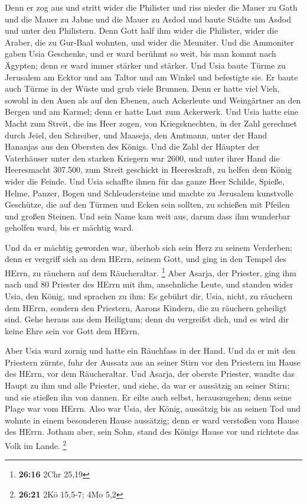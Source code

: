  Denn er zog aus und stritt wider die Philister und riss
nieder die Mauer zu Gath und die Mauer zu Jabne und die Mauer zu Asdod
und baute Städte um Asdod und unter den Philistern.  Denn
Gott half ihm wider die Philister, wider die Araber, die zu Gur-Baal
wohnten, und wider die Meuniter.  Und die Ammoniter gaben
Usia Geschenke, und er ward berühmt so weit, bis man kommt nach Ägypten;
denn er ward immer stärker und stärker.  Und Usia baute
Türme zu Jerusalem am Ecktor und am Taltor und am Winkel und befestigte
sie.  Er baute auch Türme in der Wüste und grub viele
Brunnen. Denn er hatte viel Vieh, sowohl in den Auen als auf den Ebenen,
auch Ackerleute und Weingärtner an den Bergen und am Karmel; denn er
hatte Lust zum Ackerwerk.  Und Usia hatte eine Macht zum
Streit, die ins Heer zogen, von Kriegsknechten, in der Zahl gerechnet
durch Jeiel, den Schreiber, und Maaseja, den Amtmann, unter der Hand
Hananjas aus den Obersten des Königs.  Und die Zahl der
Häupter der Vaterhäuser unter den starken Kriegern war 2600,
 und unter ihrer Hand die Heeresmacht 307.500, zum Streit
geschickt in Heereskraft, zu helfen dem König wider die Feinde.
 Und Usia schaffte ihnen für das ganze Heer Schilde,
Spieße, Helme, Panzer, Bogen und Schleudersteine  und
machte zu Jerusalem kunstvolle Geschütze, die auf den Türmen und Ecken
sein sollten, zu schießen mit Pfeilen und großen Steinen. Und sein Name
kam weit aus, darum dass ihm wunderbar geholfen ward, bis er mächtig
ward.

 Und da er mächtig geworden war, überhob sich sein Herz zu
seinem Verderben; denn er vergriff sich an dem HErrn, seinem Gott, und
ging in den Tempel des HErrn, zu räuchern auf dem Räucheraltar.
\footnote{\textbf{26:16} 2Chr 25,19}  Aber Asarja, der
Priester, ging ihm nach und 80 Priester des HErrn mit ihm, ansehnliche
Leute,  und standen wider Usia, den König, und sprachen zu
ihm: Es gebührt dir, Usia, nicht, zu räuchern dem HErrn, sondern den
Priestern, Aarons Kindern, die zu räuchern geheiligt sind. Gehe heraus
aus dem Heiligtum; denn du vergreifst dich, und es wird dir keine Ehre
sein vor Gott dem HErrn.

 Aber Usia ward zornig und hatte ein Räuchfass in der Hand.
Und da er mit den Priestern zürnte, fuhr der Aussatz aus an seiner Stirn
vor den Priestern im Hause des HErrn, vor dem Räucheraltar.
 Und Asarja, der oberste Priester, wandte das Haupt zu ihm
und alle Priester, und siehe, da war er aussätzig an seiner Stirn; und
sie stießen ihn von dannen. Er eilte auch selbst, herauszugehen; denn
seine Plage war vom HErrn.  Also war Usia, der König,
aussätzig bis an seinen Tod und wohnte in einem besonderen Hause
aussätzig; denn er ward verstoßen vom Hause des HErrn. Jotham aber, sein
Sohn, stand des Königs Hause vor und richtete das Volk im Lande.
\footnote{\textbf{26:21} 2Kö 15,5-7; 4Mo 5,2}

